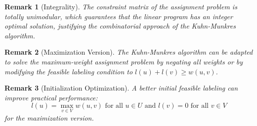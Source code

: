 \documentclass{article}
\newtheorem{remark}{Remark}
\theoremstyle{definition}
\begin{document}
\begin{remark}[Integrality]
The constraint matrix of the assignment problem is totally unimodular, which guarantees that the linear program has an integer optimal solution, justifying the combinatorial approach of the Kuhn-Munkres algorithm.
\end{remark}


\begin{remark}[Maximization Version]
The Kuhn-Munkres algorithm can be adapted to solve the maximum-weight assignment problem by negating all weights or by modifying the feasible labeling condition to $l(u) + l(v) \geq w(u,v)$.
\end{remark}

\begin{remark}[Initialization Optimization]
A better initial feasible labeling can improve practical performance:
\begin{equation}
l(u) = \max_{v \in V} w(u,v) \text{ for all } u \in U \text{ and } l(v) = 0 \text{ for all } v \in V
\end{equation}
for the maximization version.
\end{remark}
\end{document}
